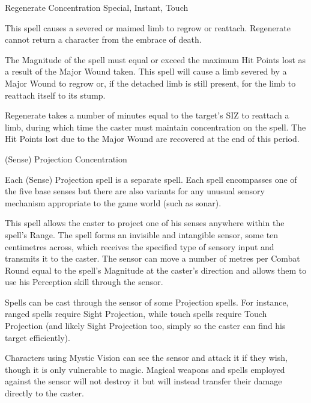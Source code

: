 %


\begin{rpg-spell}
{Regenerate}
{Concentration Special, Instant, Touch}

This spell causes a severed or maimed limb to regrow or reattach. Regenerate cannot return a character from the embrace of death. 

The Magnitude of the spell must equal or exceed the maximum Hit Points lost as a result of the Major Wound taken. This spell will cause a limb severed by a Major Wound to regrow or, if the detached limb is still present, for the limb to reattach itself to its stump. 

Regenerate takes a number of minutes equal to the target’s SIZ to reattach a limb, during which time the caster must maintain concentration on the spell. The Hit Points lost due to the Major Wound are recovered at the end of this period.
\end{rpg-spell}


\begin{rpg-spell}
{(Sense) Projection}
{Concentration}

Each (Sense) Projection spell is a separate spell. Each spell encompasses one of the five base senses but there are also variants for any unusual sensory mechanism appropriate to the game world (such as sonar). 

This spell allows the caster to project one of his senses anywhere within the spell’s Range. The spell forms an invisible and intangible sensor, some ten centimetres across, which receives the specified type of sensory input and transmits it to the caster. The sensor can move a number of metres per Combat Round equal to the spell’s Magnitude at the caster’s direction and allows them to use his Perception skill through the sensor. 

Spells can be cast through the sensor of some Projection spells. For instance, ranged spells require Sight Projection, while touch spells require Touch Projection (and likely Sight Projection too, simply so the caster can find his target efficiently). 

Characters using Mystic Vision can see the sensor and attack it if they wish, though it is only vulnerable to magic. Magical weapons and spells employed against the sensor will not destroy it but will instead transfer their damage directly to the caster.
\end{rpg-spell}


